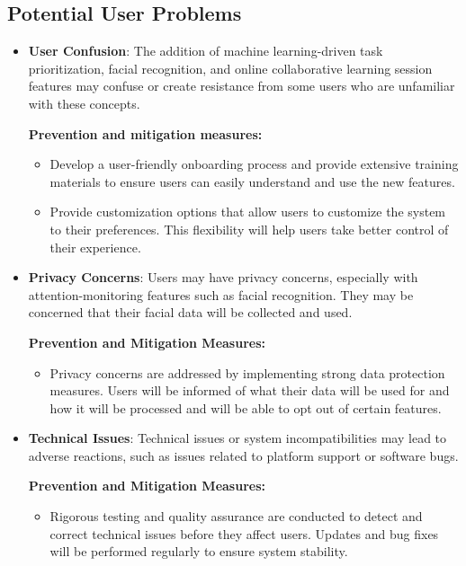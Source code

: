 \documentclass[12pt]{article}
\begin{document}
\subsection{Potential User Problems}
\begin{itemize}
    \item \textbf{User Confusion}:
    The addition of machine learning-driven task prioritization, facial recognition, and online collaborative learning session features may confuse or create resistance from some users who are unfamiliar with these concepts.
    
    \textbf{Prevention and mitigation measures:}
    \begin{itemize}
        \item Develop a user-friendly onboarding process and provide extensive training materials to ensure users can easily understand and use the new features.
        \item Provide customization options that allow users to customize the system to their preferences. This flexibility will help users take better control of their experience.
    \end{itemize}
    
    \item \textbf{Privacy Concerns}:
    Users may have privacy concerns, especially with attention-monitoring features such as facial recognition. They may be concerned that their facial data will be collected and used.
    
    \textbf{Prevention and Mitigation Measures:}
    \begin{itemize}
        \item Privacy concerns are addressed by implementing strong data protection measures. Users will be informed of what their data will be used for and how it will be processed and will be able to opt out of certain features.
    \end{itemize}
    
    \item \textbf{Technical Issues}:
    Technical issues or system incompatibilities may lead to adverse reactions, such as issues related to platform support or software bugs.
    
    \textbf{Prevention and Mitigation Measures:}
    \begin{itemize}
        \item Rigorous testing and quality assurance are conducted to detect and correct technical issues before they affect users. Updates and bug fixes will be performed regularly to ensure system stability.
    \end{itemize}
\end{itemize}
\end{document}
